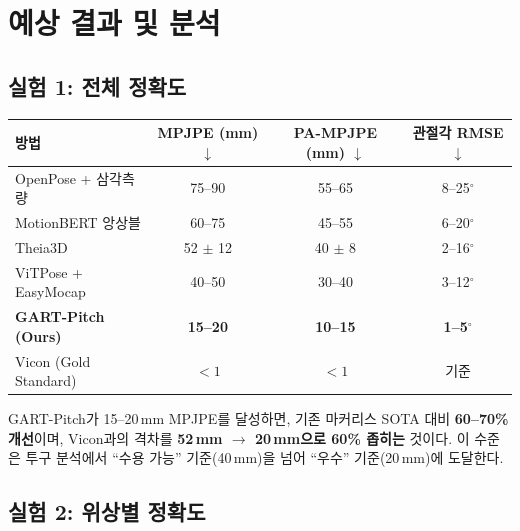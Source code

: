 \documentclass[11pt, a4paper]{report}
\begin{document}
\chapter{예상 결과 및 분석}
\label{ch:expected_results}

\section{실험 1: 전체 정확도}

\begin{resultbox}[title={예상 결과: 3D 자세 정확도}]
\begin{center}
\renewcommand{\arraystretch}{1.3}
\begin{tabular}{lccc}
\toprule
\textbf{방법} & \textbf{MPJPE (mm) $\downarrow$} & \textbf{PA-MPJPE (mm) $\downarrow$} & \textbf{관절각 RMSE $\downarrow$} \\
\midrule
OpenPose + 삼각측량 & 75--90 & 55--65 & 8--25$^\circ$ \\
MotionBERT 앙상블 & 60--75 & 45--55 & 6--20$^\circ$ \\
Theia3D & 52 $\pm$ 12 & 40 $\pm$ 8 & 2--16$^\circ$ \\
ViTPose + EasyMocap & 40--50 & 30--40 & 3--12$^\circ$ \\
\textbf{GART-Pitch (Ours)} & \textbf{15--20} & \textbf{10--15} & \textbf{1--5$^\circ$} \\
\midrule
Vicon (Gold Standard) & $< 1$ & $< 1$ & 기준 \\
\bottomrule
\end{tabular}
\end{center}
\end{resultbox}

\begin{keyidea}
GART-Pitch가 15--20\,mm MPJPE를 달성하면,
기존 마커리스 SOTA 대비 \textbf{60--70\% 개선}이며,
Vicon과의 격차를 \textbf{52\,mm $\rightarrow$ 20\,mm으로 60\% 좁히는} 것이다.
이 수준은 투구 분석에서 ``수용 가능'' 기준(40\,mm)을 넘어 ``우수'' 기준(20\,mm)에 도달한다.
\end{keyidea}


\section{실험 2: 위상별 정확도}
\end{document}
